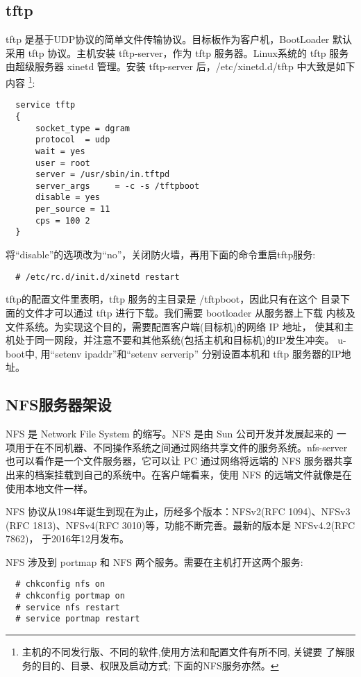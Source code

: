 \subsection{tftp}
tftp 是基于UDP协议的简单文件传输协议。目标板作为客户机，BootLoader 默认
采用 tftp 协议。主机安装 tftp-server，作为 tftp 服务器。Linux系统的 tftp
服务由超级服务器 xinetd 管理。安装 tftp-server 后，/etc/xinetd.d/tftp
中大致是如下内容
\footnote{主机的不同发行版、不同的软件,使用方法和配置文件有所不同, 关键要
了解服务的目的、目录、权限及启动方式; 下面的NFS服务亦然。}:

\begin{verbatim}
  service tftp
  { 
      socket_type = dgram
      protocol  = udp
      wait = yes
      user = root
      server = /usr/sbin/in.tftpd
      server_args     = -c -s /tftpboot
      disable = yes
      per_source = 11
      cps = 100 2
  }
\end{verbatim}

    将``disable''的选项改为``no''，关闭防火墙，再用下面的命令重启tftp服务:

\begin{verbatim}
  # /etc/rc.d/init.d/xinetd restart
\end{verbatim}

	tftp的配置文件里表明，tftp 服务的主目录是 /tftpboot，因此只有在这个
目录下面的文件才可以通过 tftp 进行下载。我们需要 bootloader 从服务器上下载
内核及文件系统。为实现这个目的，需要配置客户端(目标机)的网络 IP 地址，
使其和主机处于同一网段，并注意不要和其他系统(包括主机和目标机)的IP发生冲突。
u-boot中, 用``setenv ipaddr''和``setenv serverip'' 分别设置本机和 tftp
服务器的IP地址。

\subsection{NFS服务器架设}
NFS 是 Network File System 的缩写。NFS 是由 Sun 公司开发并发展起来的
一项用于在不同机器、不同操作系统之间通过网络共享文件的服务系统。nfs-server
也可以看作是一个文件服务器，它可以让 PC 通过网络将远端的 NFS 服务器共享
出来的档案挂载到自己的系统中。在客户端看来，使用 NFS 的远端文件就像是在
使用本地文件一样。

    NFS 协议从1984年诞生到现在为止，历经多个版本：NFSv2(RFC 1094)、NFSv3
(RFC 1813)、NFSv4(RFC 3010)等，功能不断完善。最新的版本是 NFSv4.2(RFC 7862)，
于2016年12月发布。

    NFS 涉及到 portmap 和 NFS 两个服务。需要在主机打开这两个服务:

\begin{verbatim}
  # chkconfig nfs on
  # chkconfig portmap on
  # service nfs restart
  # service portmap restart
\end{verbatim}

